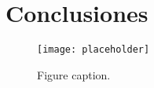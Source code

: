 \documentclass{article}
\begin{document}

\section{Conclusiones}

\begin{figure}[h]
\begin{center}
\texttt{[image: placeholder]} %
\caption{Figure caption.}
\end{center}
\end{figure}






\end{document}
